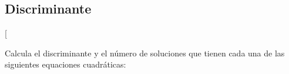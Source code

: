 \documentclass[12pt,addpoints,answers]{repaso}
\begin{document}
\begin{questions}

    \subsection*{Discriminante}

    \ejemplosboxed[{Calcula el discriminante y el número de soluciones que tienen cada una de las siguientes equaciones cuadráticas:
                \begin{multicols}{2}
\end{multicols}}
\end{questions}
\end{document}
